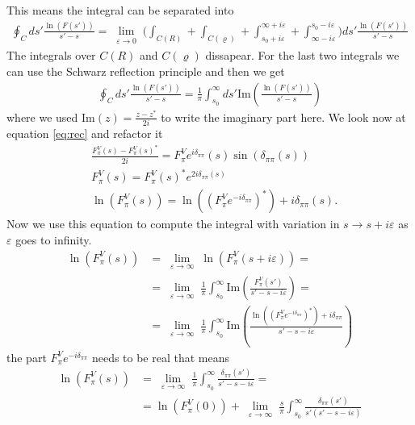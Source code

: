 \documentclass[a4paper]{article}
\begin{document}
This means the integral can be separated into
\begin{align}
    \oint_C ds' \frac{\ln(F(s'))}{s'-s} =
    \lim_{\substack{\varepsilon \rightarrow 0}}
    \bigg(
    \int_{C(R)} + \int_{C(\varrho)} + \int_{s_0+i\varepsilon}^{\infty
    +i\varepsilon} +  \int^{s_0-i\varepsilon}_{\infty
    -i\varepsilon}
    \bigg) ds' \frac{\ln(F(s'))}{s'-s}
\end{align}
The integrals over $C(R)$ and $C(\varrho)$ dissapear. For the last two
integrals we can use the Schwarz reflection principle and then we get
\begin{align}
    \oint_C ds' \frac{\ln(F(s'))}{s'-s} = \frac{1}{\pi} \int_{s_0}^{\infty}ds'
    \text{Im}\left(
    \frac{\ln(F(s'))}{s'-s}\right)
\end{align}
where we used $\text{Im}(z) = \frac{z - z^*}{2i}$ to write the imaginary part
here. We look now at equation \ref{eq:rec} and refactor it
\begin{align}
    &\frac{F_\pi^V(s)-F_\pi^V(s)^*}{2i} = F_\pi^V e^{i\delta_{\pi\pi}}(s)
    \sin(\delta_{\pi\pi}(s)) \\
    &F_\pi^V(s) = F_\pi^V(s)^* e^{2i \delta_{\pi\pi}(s)}\\
    &\ln(F_\pi^V(s)) = \ln((F_\pi^V e^{-i\delta_{\pi\pi}})^*)+
    i\delta_{\pi\pi}(s).\label{eq:use}
\end{align}
Now we use this equation to compute the integral with variation in $s
\rightarrow s+i\varepsilon$ as $\varepsilon$ goes to infinity.
\begin{align}
    \ln(F_\pi^V(s)) &= \lim_{\substack{\varepsilon \rightarrow \infty}}
    \ln(F_\pi^V(s+i\varepsilon)) = \\
    &= \lim_{\substack{\varepsilon \rightarrow \infty}}\frac{1}{\pi}
    \int_{s_0}^{\infty}
    \text{Im}\left(\frac{F_\pi^V(s')}{s'-s-i\varepsilon}\right)=\\
    &=\lim_{\substack{\varepsilon \rightarrow \infty}}\frac{1}{\pi}
    \int_{s_0}^{\infty}
    \text{Im}\left(\frac{\ln((F_\pi^V e^{-i\delta_{\pi\pi}})^*)+
    i\delta_{\pi\pi}}{s'-s-i\varepsilon}\right)
\end{align}
the part $F_\pi^V e^{-i\delta_{\pi\pi}}$ needs to be real that means
\begin{align}
    \ln(F_\pi^V(s)) &= \lim_{\substack{\varepsilon \rightarrow \infty}}\frac{1}{\pi}
    \int_{s_0}^{\infty}
    \frac{\delta_{\pi\pi}(s')}{s'-s-i\varepsilon} =\\
    &= \ln(F_\pi^V(0)) + \lim_{\substack{\varepsilon \rightarrow \infty}}
    \frac{s}{\pi}
    \int_{s_0}^{\infty}
    \frac{\delta_{\pi\pi}(s')}{s'(s'-s-i\varepsilon)}
\end{align}
\end{document}
